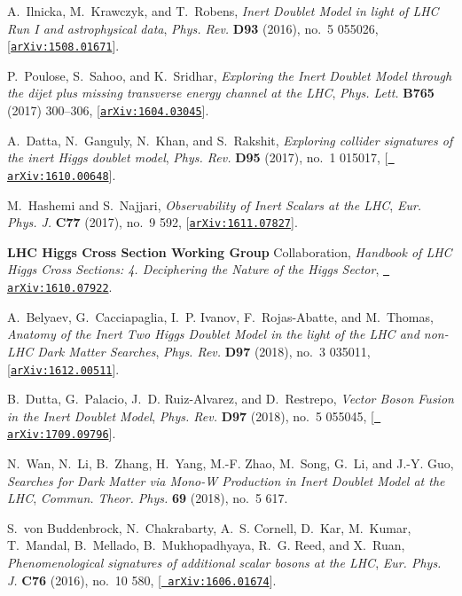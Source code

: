 \documentclass[review]{elsarticle}
\begin{document}
\begin{thebibliography}{100}
A.~Ilnicka, M.~Krawczyk, and T.~Robens, {\it {Inert Doublet Model in light of
  LHC Run I and astrophysical data}},  {\em Phys. Rev.} {\bf D93} (2016), no.~5
  055026, [\href{http://arxiv.org/abs/1508.01671}{{\tt arXiv:1508.01671}}].

P.~Poulose, S.~Sahoo, and K.~Sridhar, {\it {Exploring the Inert Doublet Model
  through the dijet plus missing transverse energy channel at the LHC}},  {\em
  Phys. Lett.} {\bf B765} (2017) 300--306,
  [\href{http://arxiv.org/abs/1604.03045}{{\tt arXiv:1604.03045}}].

A.~Datta, N.~Ganguly, N.~Khan, and S.~Rakshit, {\it {Exploring collider
  signatures of the inert Higgs doublet model}},  {\em Phys. Rev.} {\bf D95}
  (2017), no.~1 015017, [\href{http://arxiv.org/abs/1610.00648}{{\tt
  arXiv:1610.00648}}].

M.~Hashemi and S.~Najjari, {\it {Observability of Inert Scalars at the LHC}},
  {\em Eur. Phys. J.} {\bf C77} (2017), no.~9 592,
  [\href{http://arxiv.org/abs/1611.07827}{{\tt arXiv:1611.07827}}].

{\bf LHC Higgs Cross Section Working Group} Collaboration, 
{\it {Handbook of LHC Higgs Cross Sections: 4. Deciphering the Nature
  of the Higgs Sector}},  \href{http://arxiv.org/abs/1610.07922}{{\tt
  arXiv:1610.07922}}.

A.~Belyaev, G.~Cacciapaglia, I.~P. Ivanov, F.~Rojas-Abatte, and M.~Thomas, {\it
  {Anatomy of the Inert Two Higgs Doublet Model in the light of the LHC and
  non-LHC Dark Matter Searches}},  {\em Phys. Rev.} {\bf D97} (2018), no.~3
  035011, [\href{http://arxiv.org/abs/1612.00511}{{\tt arXiv:1612.00511}}].

B.~Dutta, G.~Palacio, J.~D. Ruiz-Alvarez, and D.~Restrepo, {\it {Vector Boson
  Fusion in the Inert Doublet Model}},  {\em Phys. Rev.} {\bf D97} (2018),
  no.~5 055045, [\href{http://arxiv.org/abs/1709.09796}{{\tt
  arXiv:1709.09796}}].

N.~Wan, N.~Li, B.~Zhang, H.~Yang, M.-F. Zhao, M.~Song, G.~Li, and J.-Y. Guo,
  {\it {Searches for Dark Matter via Mono-W Production in Inert Doublet Model
  at the LHC}},  {\em Commun. Theor. Phys.} {\bf 69} (2018), no.~5 617.

S.~von Buddenbrock, N.~Chakrabarty, A.~S. Cornell, D.~Kar, M.~Kumar, T.~Mandal,
  B.~Mellado, B.~Mukhopadhyaya, R.~G. Reed, and X.~Ruan, {\it {Phenomenological
  signatures of additional scalar bosons at the LHC}},  {\em Eur. Phys. J.}
  {\bf C76} (2016), no.~10 580, [\href{http://arxiv.org/abs/1606.01674}{{\tt
  arXiv:1606.01674}}].


\end{thebibliography}
\end{document}

